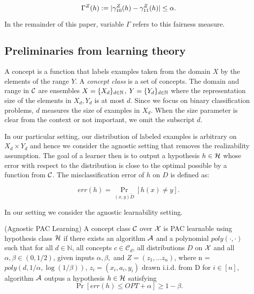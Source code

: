 $$\Gamma^Z(h) := |\gamma_{10}^Z(h) - \gamma_{11}^Z(h)| \leq \alpha.$$

In the remainder of this paper, variable $\Gamma$ refers to this
fairness measure. 


\subsection{Preliminaries from learning theory}
A concept is a function that labels examples taken from the domain $X$
by the elements of the range $Y$. A \emph{concept class} is a set of
concepts. The domain and range in $\mathcal{C}$ are ensembles $X= \{X_d\}_{d\in
\mathbb{N}}$, $Y= \{Y_d\}_{d\in \mathbb{N}}$ where the representation size of the
elements in $X_d,Y_d$ is at most $d$. Since we focus on binary
classification problems, $d$ measures the size of examples in $X_d$.
When the size parameter is clear from the context or not important, we
omit the subscript $d$.

In our particular setting, our distribution of labeled examples is
arbitrary on $X_d \times Y_d$ and hence we consider the agnostic
setting that removes the realizability assumption. The goal of a
learner then is to output a hypothesis $h \in \mathcal{H}$ whose error with
respect to the distribution is close to the optimal possible by a
function from $\mathcal{C}$. The misclassification error of $h$ on $D$ is
defined as:

$$err(h) = \Pr_{(x,y) \tilde D}[h(x) \neq y].$$

In our setting we consider the agnostic learnability setting.
\begin{defn}
	(Agnostic PAC Learning) A concept class $\mathcal{C}$ over $\mathcal{X}$ is PAC
  learnable using hypothesis class $\mathcal{H}$ if there exists an algorithm
  $\mathcal{A}$ and a polynomial $poly(\cdot,\cdot)$ such that for all $d \in
  \mathbb{N}$, all concepts $c \in \mathcal{C}_d$, all distributions
  $D$ on $\mathcal{X}$ and all $\alpha,\beta \in (0,1/2)$, given inputs
  $\alpha,\beta,$ and $Z = (z_1, ... z_n)$, where n = $poly(d,
  1/\alpha, \log(1/\beta))$, $z_i = (x_i, a_i, y_i)$ drawn i.i.d. from
  D for $i \in [n]$, algorithm $\mathcal{A}$ outpus a hypothesis $h \in \mathcal{H}$
  satisfying
	$$\Pr[err(h) \leq OPT + \alpha] \geq 1-\beta.$$

\end{defn}
